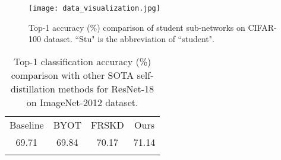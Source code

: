\documentclass[letterpaper]{article} %
\begin{document}

\begin{figure}
	\centering
	\texttt{[image: data\_visualization.jpg]}
	\caption{
        Top-1 accuracy (\%) comparison of student sub-networks on CIFAR-100 dataset. ``Stu" is the abbreviation of ``student".
	}
	\label{fig:data_visualization}
\end{figure}


\begin{table}
	\begin{center}
		\resizebox{0.7\linewidth}{!}
		{
			\begin{tabular}{cccc}
				\hline\noalign{\smallskip}
				Baseline & BYOT  & FRSKD & Ours  \\
				\noalign{\smallskip}\hline\noalign{\smallskip}
				69.71    & 69.84 & 70.17 &	71.14	\\
				\noalign{\smallskip}\hline
			\end{tabular}
		}
		\caption{Top-1 classification accuracy (\%) comparison with other SOTA self-distillation methods for ResNet-18 on ImageNet-2012 dataset.}
		\label{table:imagenet}
	\end{center}
\end{table}
\end{document}
